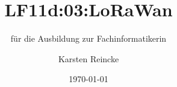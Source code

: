 \documentclass[]{beamer}
\title{LF11d:03:LoRaWan}
\subtitle{für die Ausbildung zur Fachinformatikerin}
\institute{GS-LDK}
\author{Karsten Reincke}
\date{\today}
\def\cfgGl{../../../cfg.gl/}
\begin{document}

\begin{frame}
  \titlepage

  
\end{frame}






\logo{}
\newpage



%
\end{document}
